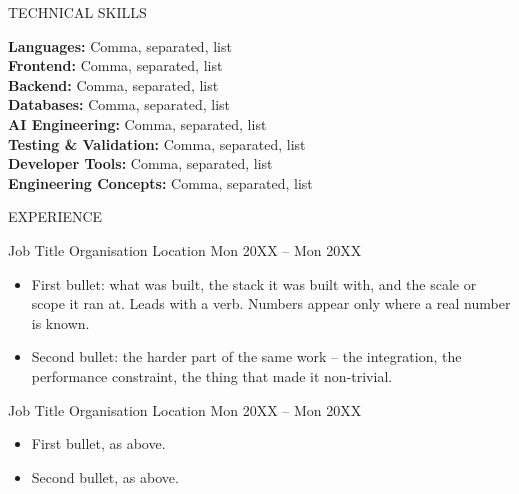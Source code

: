 \documentclass{resume} %
\begin{document}
\begin{rSection}{TECHNICAL SKILLS}

\setlength{\parskip}{6pt}
\setlength{\parindent}{2pt}

\textbf{Languages:} Comma, separated, list \\[2pt]
\textbf{Frontend:} Comma, separated, list \\[2pt]
\textbf{Backend:} Comma, separated, list \\[2pt]
\textbf{Databases:} Comma, separated, list \\[2pt]
\textbf{AI Engineering:} Comma, separated, list \\[2pt]
\textbf{Testing \& Validation:} Comma, separated, list \\[2pt]
\textbf{Developer Tools:} Comma, separated, list \\[2pt]
\textbf{Engineering Concepts:} Comma, separated, list

\end{rSection}

\vspace{-2pt}


\begin{rSection}{EXPERIENCE}

\setlength{\parskip}{6pt}
\setlength{\parindent}{2pt}

\experienceHeading
{Job Title}
{Organisation}
{Location}
{Mon 20XX -- Mon 20XX}

\begin{itemize}
    \itemsep -3pt {}

    \item First bullet: what was built, the stack it was built with, and the
    scale or scope it ran at. Leads with a verb. Numbers appear only where a
    real number is known.

    \item Second bullet: the harder part of the same work -- the integration,
    the performance constraint, the thing that made it non-trivial.

\end{itemize}

\experienceHeading
{Job Title}
{Organisation}
{Location}
{Mon 20XX -- Mon 20XX}

\begin{itemize}
    \itemsep -3pt {}

    \item First bullet, as above.

    \item Second bullet, as above.

\end{itemize}

\end{rSection}
\end{document}

